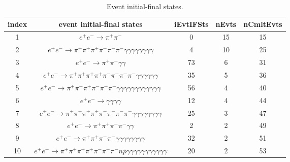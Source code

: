 \documentclass[landscape]{article}
\begin{document}
\begin{table}[htbp!]
\end{table}

\clearpage

\begin{table}[htbp!]
\caption{Event initial-final states.}
\small
\centering
\begin{tabular}{|c|c|c|c|c|}
\hline
index & event initial-final states & iEvtIFSts & nEvts & nCmltEvts \\
\hline
1 & $ e^{+} e^{-} \rightarrow \pi^{+} \pi^{-} $ & 0 & 15 & 15 \\
\hline
2 & $ e^{+} e^{-} \rightarrow \pi^{+} \pi^{+} \pi^{+} \pi^{-} \pi^{-} \pi^{-} \gamma \gamma \gamma \gamma \gamma \gamma \gamma \gamma $ & 4 & 10 & 25 \\
\hline
3 & $ e^{+} e^{-} \rightarrow \pi^{+} \pi^{-} \gamma \gamma $ & 73 & 6 & 31 \\
\hline
4 & $ e^{+} e^{-} \rightarrow \pi^{+} \pi^{+} \pi^{+} \pi^{+} \pi^{-} \pi^{-} \pi^{-} \pi^{-} \gamma \gamma \gamma \gamma \gamma \gamma $ & 35 & 5 & 36 \\
\hline
5 & $ e^{+} e^{-} \rightarrow \pi^{+} \pi^{+} \pi^{+} \pi^{-} \pi^{-} \pi^{-} \gamma \gamma \gamma \gamma \gamma \gamma \gamma \gamma \gamma \gamma \gamma \gamma $ & 56 & 4 & 40 \\
\hline
6 & $ e^{+} e^{-} \rightarrow \gamma \gamma \gamma \gamma $ & 12 & 4 & 44 \\
\hline
7 & $ e^{+} e^{-} \rightarrow \pi^{+} \pi^{+} \pi^{+} \pi^{+} \pi^{-} \pi^{-} \pi^{-} \pi^{-} \gamma \gamma \gamma \gamma \gamma \gamma \gamma \gamma $ & 25 & 3 & 47 \\
\hline
8 & $ e^{+} e^{-} \rightarrow \pi^{+} \pi^{+} \pi^{-} \pi^{-} \gamma \gamma $ & 2 & 2 & 49 \\
\hline
9 & $ e^{+} e^{-} \rightarrow \pi^{+} \pi^{+} \pi^{-} \pi^{-} \gamma \gamma \gamma \gamma \gamma \gamma \gamma \gamma $ & 32 & 2 & 51 \\
\hline
10 & $ e^{+} e^{-} \rightarrow \pi^{+} \pi^{+} \pi^{+} \pi^{+} \pi^{-} \pi^{-} \pi^{-} n \bar{p} \gamma \gamma \gamma \gamma \gamma \gamma \gamma \gamma \gamma \gamma \gamma $ & 20 & 2 & 53 \\

\end{tabular}
\end{table}
\end{document}
